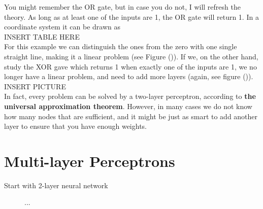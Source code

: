 \documentclass[norsk,a4paper,12pt]{article}
\begin{document}
You might remember the OR gate, but in case you do not, I will refresh the theory. As long as at least one of the inputs are 1, the OR gate will return 1. In a coordinate system it can be drawn as\\
INSERT TABLE HERE\\
For this example we can distinguish the ones from the zero with one single straight line, making it a linear problem (see Figure ()). If we, on the other hand, study the XOR gave which returns 1 when exactly one of the inputs are 1, we no longer have a linear problem, and need to add more layers (again, see figure ()). \\
INSERT PICTURE\\

In fact, every problem can be solved by a two-layer perceptron, according to \textbf{the universal approximation theorem}. However, in many cases we do not know how many nodes that are sufficient, and it might be just as smart to add another layer to ensure that you have enough weights. 

\newpage
\section{Multi-layer Perceptrons}
Start with 2-layer neural network\\
\begin{figure}[H]
\centering
{}
\caption{...}
\end{figure}
\end{document}
